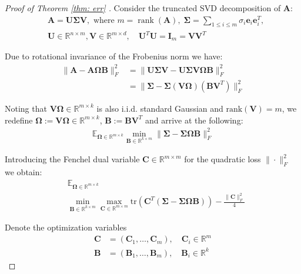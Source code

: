 \documentclass[conference]{IEEEtran}
\newcommand{\rk}[1]{\operatorname{rank}(#1)}
\newcommand{\bA}{\mathbf{A}}
\begin{document}
\begin{proof}[Proof of Theorem \ref{thm: err} ]
Consider the truncated SVD decomposition of $\mathbf{A}$:
\begin{align*}
   & \mathbf{A} = \mathbf{U} \boldsymbol{\Sigma} \mathbf{V}, \text{ where } m = \rk\bA,
    \; \boldsymbol{\Sigma} = \sum_{1 \le i \le m} \sigma_i \mathbf{e}_i\mathbf{e}_i^T, \nonumber\\
    &\mathbf{U} \in \mathbb{R}^{n \times m}, \mathbf{V} \in \mathbb{R}^{m \times d}, \quad
    \mathbf{U}^T\mathbf{U} = \mathbf{I}_m = \mathbf{V}\mathbf{V}^T \nonumber
\end{align*}

Due to rotational invariance of the Frobenius norm we have: 
\begin{align*}
   \|\mathbf{A} - \mathbf{A}\boldsymbol{\Omega} \mathbf{B}\|_F^2  &=  \|\mathbf{U}\boldsymbol{\Sigma}\mathbf{V} -\mathbf{U}\boldsymbol{\Sigma}\mathbf{V}\boldsymbol{\Omega} \mathbf{B}\|_F^2 \\
     & = \|\boldsymbol{\Sigma} -\boldsymbol{\Sigma}(\mathbf{V}\boldsymbol{\Omega})(\mathbf{B}\mathbf{V}^T)\|_F^2 \nonumber
\end{align*}

Noting that $\mathbf{V}\boldsymbol{\Omega} \in\mathbb{R}^{m \times k}$ is also i.i.d. standard Gaussian and $\mathrm{rank}(\mathbf{V})=m$, we redefine $\boldsymbol{\Omega} := \mathbf{V}\boldsymbol{\Omega} \in \mathbb{R}^{m \times k}$, $\mathbf{B} := \mathbf{B}\mathbf{V}^T$ and arrive at the following: 
\begin{align*}
    \mathbb{E}_{\boldsymbol{\Omega} \in \mathbb{R}^{m \times k}} \min_{\mathbf{B} \in \mathbb{R}^{k \times m}} \|\boldsymbol{\Sigma} - \boldsymbol{\Sigma}\boldsymbol{\Omega} \mathbf{B}\|_F^2
\end{align*}

Introducing the Fenchel dual variable $\mathbf{C} \in \mathbb{R}^{m \times m}$ for the quadratic loss $\|\cdot\|_F^2$ we obtain:
\begin{align}\label{eq: fen_dual}
    &\mathbb{E}_{\boldsymbol{\Omega} \in \mathbb{R}^{m \times k}} \\ &\min_{\mathbf{B} \in \mathbb{R}^{k \times m}} \max_{\mathbf{C} \in \mathbb{R}^{m \times m}} \mathrm{tr}\left(\mathbf{C}^T\left(\boldsymbol{\Sigma} - \boldsymbol{\Sigma}\boldsymbol{\Omega} \mathbf{B}\right)\right) - \frac{\|\mathbf{C}\|_F^2}{4} \nonumber
\end{align}

Denote the optimization variables
\begin{align*}
    \mathbf{C} &= (\mathbf{C}_1, \dots, \mathbf{C}_m), \quad \mathbf{C}_i \in \mathbb{R}^m\\ \mathbf{B} &= (\mathbf{B}_1, \dots, \mathbf{B}_m), \quad  \mathbf{B}_i \in \mathbb{R}^k
\end{align*}


\end{proof}
\end{document}
